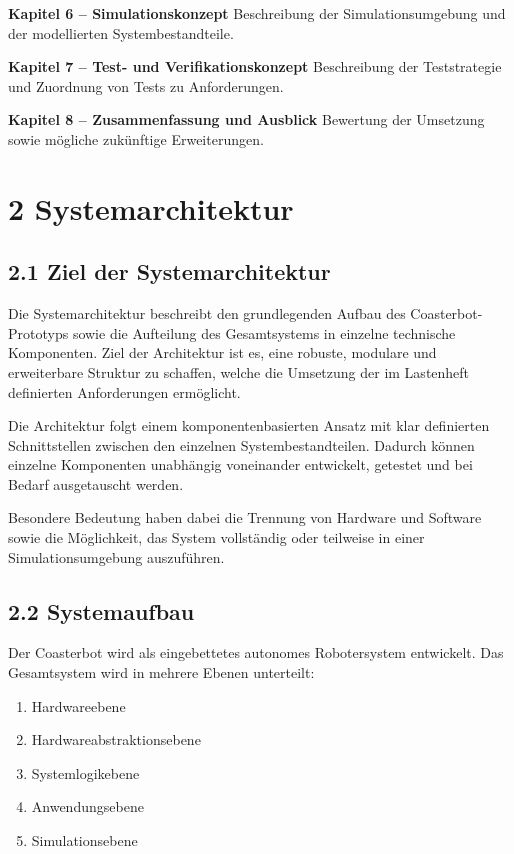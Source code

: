 \documentclass[
  a4paper,
  12pt,
  DIV=12,        %
  parskip=half,  %
  headings=small %
]{scrartcl}
\theoremstyle{definition}
\providecommand{\tightlist}{%
  \setlength{\itemsep}{0pt}\setlength{\parskip}{0pt}}
\theoremstyle{definition}
\providecommand{\tightlist}{%
  \setlength{\itemsep}{0pt}\setlength{\parskip}{0pt}}
\begin{document}
\textbf{Kapitel 6 -- Simulationskonzept} Beschreibung der
Simulationsumgebung und der modellierten Systembestandteile.

\textbf{Kapitel 7 -- Test- und Verifikationskonzept} Beschreibung der
Teststrategie und Zuordnung von Tests zu Anforderungen.

\textbf{Kapitel 8 -- Zusammenfassung und Ausblick} Bewertung der
Umsetzung sowie mögliche zukünftige Erweiterungen.

\section{2 Systemarchitektur}\label{systemarchitektur}

\subsection{2.1 Ziel der
Systemarchitektur}\label{ziel-der-systemarchitektur}

Die Systemarchitektur beschreibt den grundlegenden Aufbau des
Coasterbot-Prototyps sowie die Aufteilung des Gesamtsystems in einzelne
technische Komponenten. Ziel der Architektur ist es, eine robuste,
modulare und erweiterbare Struktur zu schaffen, welche die Umsetzung der
im Lastenheft definierten Anforderungen ermöglicht.

Die Architektur folgt einem komponentenbasierten Ansatz mit klar
definierten Schnittstellen zwischen den einzelnen Systembestandteilen.
Dadurch können einzelne Komponenten unabhängig voneinander entwickelt,
getestet und bei Bedarf ausgetauscht werden.

Besondere Bedeutung haben dabei die Trennung von Hardware und Software
sowie die Möglichkeit, das System vollständig oder teilweise in einer
Simulationsumgebung auszuführen.

\subsection{2.2 Systemaufbau}\label{systemaufbau}

Der Coasterbot wird als eingebettetes autonomes Robotersystem
entwickelt. Das Gesamtsystem wird in mehrere Ebenen unterteilt:

\begin{enumerate}
\def\labelenumi{\arabic{enumi}.}
\tightlist
\item
  Hardwareebene
\item
  Hardwareabstraktionsebene
\item
  Systemlogikebene
\item
  Anwendungsebene
\item
  Simulationsebene
\end{enumerate}
\end{document}
